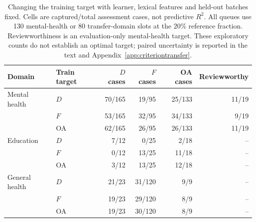 \begin{table}[htbp]
\centering\small
\caption{Changing the training target with learner, lexical features and held-out batches fixed. Cells are captured/total assessment cases, not predictive $R^2$. All queues use 130 mental-health or 80 transfer-domain slots at the 20\% reference fraction. Reviewworthiness is an evaluation-only mental-health target. These exploratory counts do not establish an optimal target; paired uncertainty is reported in the text and Appendix~\ref{app:criteriontransfer}.}
\label{tab:criteriontransfer}
\begin{tabular}{llrrrr}
\toprule
Domain & Train target & $D$ cases & $F$ cases & OA cases & Reviewworthy \\
\midrule
Mental health & $D$ & 70/165 & 19/95 & 25/133 & 11/19 \\
 & $F$ & 53/165 & 32/95 & 34/133 & 9/19 \\
 & OA & 62/165 & 26/95 & 26/133 & 11/19 \\
Education & $D$ & 7/12 & 0/25 & 2/18 & -- \\
 & $F$ & 0/12 & 13/25 & 11/18 & -- \\
 & OA & 3/12 & 13/25 & 12/18 & -- \\
General health & $D$ & 21/23 & 31/120 & 9/9 & -- \\
 & $F$ & 19/23 & 29/120 & 8/9 & -- \\
 & OA & 19/23 & 30/120 & 8/9 & -- \\
\bottomrule
\end{tabular}
\end{table}

